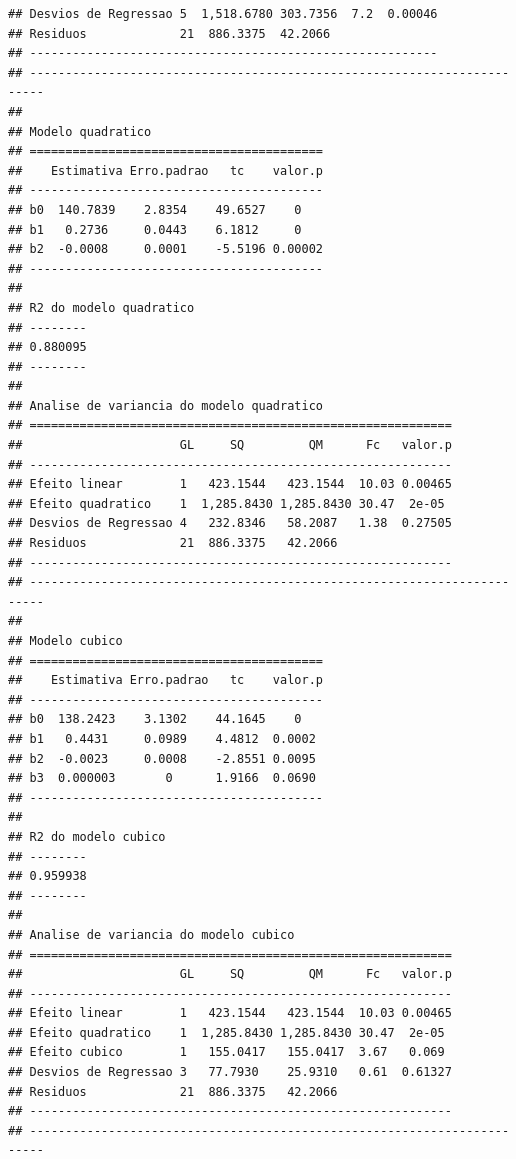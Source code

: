 \documentclass[
]{book}
\begin{document}
\begin{verbatim}
## Desvios de Regressao 5  1,518.6780 303.7356  7.2  0.00046
## Residuos             21  886.3375  42.2066               
## ---------------------------------------------------------
## ------------------------------------------------------------------------
## 
## Modelo quadratico
## =========================================
##    Estimativa Erro.padrao   tc    valor.p
## -----------------------------------------
## b0  140.7839    2.8354    49.6527    0   
## b1   0.2736     0.0443    6.1812     0   
## b2  -0.0008     0.0001    -5.5196 0.00002
## -----------------------------------------
## 
## R2 do modelo quadratico
## --------
## 0.880095
## --------
## 
## Analise de variancia do modelo quadratico
## ===========================================================
##                      GL     SQ         QM      Fc   valor.p
## -----------------------------------------------------------
## Efeito linear        1   423.1544   423.1544  10.03 0.00465
## Efeito quadratico    1  1,285.8430 1,285.8430 30.47  2e-05 
## Desvios de Regressao 4   232.8346   58.2087   1.38  0.27505
## Residuos             21  886.3375   42.2066                
## -----------------------------------------------------------
## ------------------------------------------------------------------------
## 
## Modelo cubico
## =========================================
##    Estimativa Erro.padrao   tc    valor.p
## -----------------------------------------
## b0  138.2423    3.1302    44.1645    0   
## b1   0.4431     0.0989    4.4812  0.0002 
## b2  -0.0023     0.0008    -2.8551 0.0095 
## b3  0.000003       0      1.9166  0.0690 
## -----------------------------------------
## 
## R2 do modelo cubico
## --------
## 0.959938
## --------
## 
## Analise de variancia do modelo cubico
## ===========================================================
##                      GL     SQ         QM      Fc   valor.p
## -----------------------------------------------------------
## Efeito linear        1   423.1544   423.1544  10.03 0.00465
## Efeito quadratico    1  1,285.8430 1,285.8430 30.47  2e-05 
## Efeito cubico        1   155.0417   155.0417  3.67   0.069 
## Desvios de Regressao 3   77.7930    25.9310   0.61  0.61327
## Residuos             21  886.3375   42.2066                
## -----------------------------------------------------------
## ------------------------------------------------------------------------
\end{verbatim}
\end{document}
